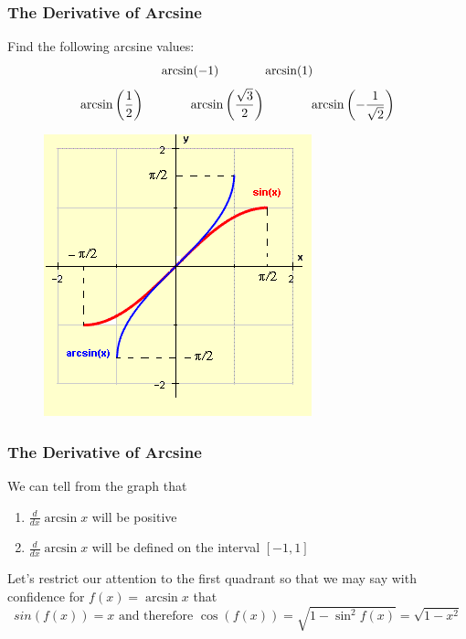 \documentclass[xcolor=dvipsnames]{beamer}
\begin{document}
\begin{frame}
  \frametitle{The Derivative of Arcsine}
  {\ubung} Find the following arcsine values:
  \begin{equation}
    \label{eq:ahquoila}
    \arcsin(-1)\hspace{.5in}\arcsin(1)\notag
  \end{equation}
  \begin{equation}
    \label{eq:eengaine}
    \arcsin\left(\frac{1}{2}\right)\hspace{.5in}\arcsin\left(\frac{\sqrt{3}}{2}\right)\hspace{.5in}\arcsin\left(-\frac{1}{\sqrt{2}}\right)\notag
  \end{equation}
\begin{figure}[h]
\includegraphics[scale=.5]{./diagrams/arcsin.png}
\end{figure}
\end{frame}

\begin{frame}
  \frametitle{The Derivative of Arcsine}
  We can tell from the graph that
  \begin{enumerate}
  \item $\frac{d}{dx}\arcsin{}x$ will be positive
  \item $\frac{d}{dx}\arcsin{}x$ will be defined on the interval $[-1,1]$
  \end{enumerate}

  \bigskip

  Let's restrict our attention to the first quadrant so that we may say
with confidence for $f(x)=\arcsin{}x$ that
\begin{equation}
  \label{eq:sieheuvu}
  sin(f(x))=x\mbox{ and therefore }\cos{}(f(x))=\sqrt{1-\sin^{2}f(x)}=\sqrt{1-x^{2}}
\end{equation}
\end{frame}
\end{document}
